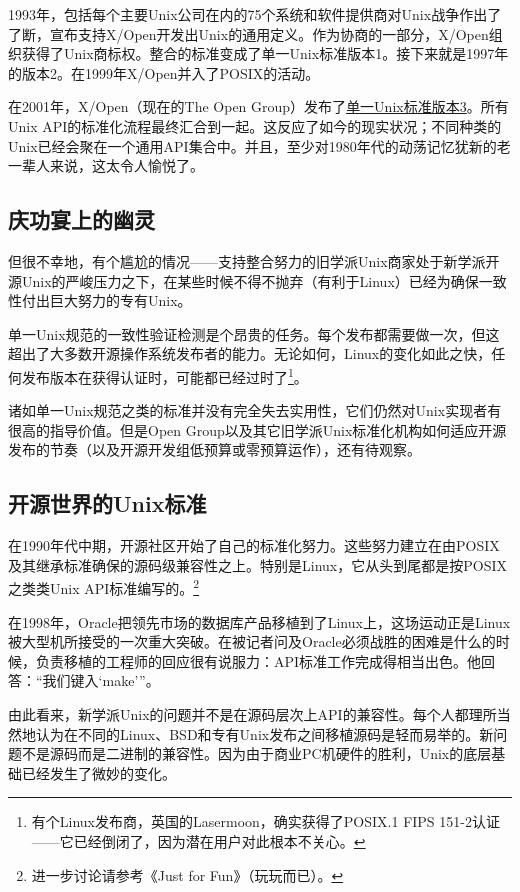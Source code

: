 \documentclass[12pt,oneside]{book}
\begin{document}
1993年，包括每个主要Unix公司在内的75个系统和软件提供商对Unix战争作出了了断，宣布支持X/Open开发出Unix的通用定义。作为协商的一部分，X/Open组织获得了Unix商标权。整合的标准变成了单一Unix标准版本1。接下来就是1997年的版本2。在1999年X/Open并入了POSIX的活动。

在2001年，X/Open（现在的The Open Group）发布了\href{http://www.unix.org/version3/}{单一Unix标准版本3}。所有Unix API的标准化流程最终汇合到一起。这反应了如今的现实状况；不同种类的Unix已经会聚在一个通用API集合中。并且，至少对1980年代的动荡记忆犹新的老一辈人来说，这太令人愉悦了。

\subsection{庆功宴上的幽灵}
但很不幸地，有个尴尬的情况——支持整合努力的旧学派Unix商家处于新学派开源Unix的严峻压力之下，在某些时候不得不抛弃（有利于Linux）已经为确保一致性付出巨大努力的专有Unix。

单一Unix规范的一致性验证检测是个昂贵的任务。每个发布都需要做一次，但这超出了大多数开源操作系统发布者的能力。无论如何，Linux的变化如此之快，任何发布版本在获得认证时，可能都已经过时了\footnote{有个Linux发布商，英国的Lasermoon，确实获得了POSIX.1 FIPS 151-2认证——它已经倒闭了，因为潜在用户对此根本不关心。}。

诸如单一Unix规范之类的标准并没有完全失去实用性，它们仍然对Unix实现者有很高的指导价值。但是Open Group以及其它旧学派Unix标准化机构如何适应开源发布的节奏（以及开源开发组低预算或零预算运作），还有待观察。


\subsection{开源世界的Unix标准}
在1990年代中期，开源社区开始了自己的标准化努力。这些努力建立在由POSIX及其继承标准确保的源码级兼容性之上。特别是Linux，它从头到尾都是按POSIX之类类Unix API标准编写的。\footnote{进一步讨论请参考《Just for Fun》（玩玩而已）\cite{Torvalds}。}

在1998年，Oracle把领先市场的数据库产品移植到了Linux上，这场运动正是Linux被大型机所接受的一次重大突破。在被记者问及Oracle必须战胜的困难是什么的时候，负责移植的工程师的回应很有说服力：API标准工作完成得相当出色。他回答：“我们键入‘make’”。

由此看来，新学派Unix的问题并不是在源码层次上API的兼容性。每个人都理所当然地认为在不同的Linux、BSD和专有Unix发布之间移植源码是轻而易举的。新问题不是源码而是二进制的兼容性。因为由于商业PC机硬件的胜利，Unix的底层基础已经发生了微妙的变化。
\end{document}
